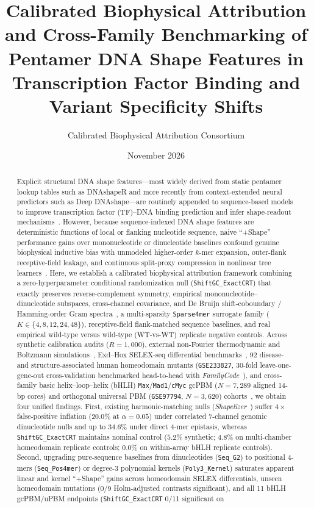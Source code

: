 \documentclass[11pt,a4paper]{article}
\title{\textbf{Calibrated Biophysical Attribution and Cross-Family Benchmarking of Pentamer DNA Shape Features in Transcription Factor Binding and Variant Specificity Shifts}}
\author{Calibrated Biophysical Attribution Consortium}
\date{November 2026}
\begin{document}
\maketitle

\begin{abstract}
Explicit structural DNA shape features---most widely derived from static pentamer lookup tables such as DNAshapeR and more recently from context-extended neural predictors such as Deep DNAshape---are routinely appended to sequence-based models to improve transcription factor (TF)--DNA binding prediction and infer shape-readout mechanisms~\cite{zhou2013nar,chiu2016bioinf,zhou2015pnas,yang2017msb,li2024natcomm,li2024nar}. However, because sequence-indexed DNA shape features are deterministic functions of local or flanking nucleotide sequence, naive ``+Shape'' performance gains over mononucleotide or dinucleotide baselines confound genuine biophysical inductive bias with unmodeled higher-order $k$-mer expansion, outer-flank receptive-field leakage, and continuous split-proxy compression in nonlinear tree learners~\cite{rube2018msb,strobl2007bmc}. Here, we establish a calibrated biophysical attribution framework combining a zero-hyperparameter conditional randomization null (\texttt{ShiftGC\_ExactCRT}) that exactly preserves reverse-complement symmetry, empirical mononucleotide--dinucleotide subspaces, cross-channel covariance, and De Bruijn shift-coboundary / Hamming-order Gram spectra~\cite{candes2018jrssb,berrett2020jrssb}, a multi-sparsity \texttt{Sparse4mer} surrogate family ($K \in \{4, 8, 12, 24, 48\}$), receptive-field flank-matched sequence baselines, and real empirical wild-type versus wild-type (WT-vs-WT) replicate negative controls. Across synthetic calibration audits ($R = 1{,}000$), external non-Fourier thermodynamic and Boltzmann simulations~\cite{santalucia1998pnas}, Exd--Hox SELEX-seq differential benchmarks~\cite{slattery2011cell,abe2015cell}, 92 disease- and structure-associated human homeodomain mutants (\texttt{GSE233827}, 30-fold leave-one-gene-out cross-validation benchmarked head-to-head with \emph{FamilyCode}~\cite{kock2024natcomm,liu2025nar}), and cross-family basic helix--loop--helix (bHLH) \texttt{Max}/\texttt{Mad1}/\texttt{cMyc} gcPBM ($N = 7{,}289$ aligned 14-bp cores) and orthogonal universal PBM (\texttt{GSE97794}, $N = 3{,}620$) cohorts~\cite{gordan2013cellrep,shen2018cels}, we obtain four unified findings. First, existing harmonic-matching nulls (\emph{Shapelizer}~\cite{rube2018msb}) suffer $4\times$ false-positive inflation ($20.0\%$ at $\alpha = 0.05$) under correlated 7-channel genomic dinucleotide nulls and up to $34.6\%$ under direct 4-mer epistasis, whereas \texttt{ShiftGC\_ExactCRT} maintains nominal control ($5.2\%$ synthetic; $4.8\%$ on multi-chamber homeodomain replicate controls; $0.0\%$ on within-array bHLH replicate controls). Second, upgrading pure-sequence baselines from dinucleotides (\texttt{Seq\_G2}) to positional 4-mers (\texttt{Seq\_Pos4mer}) or degree-3 polynomial kernels (\texttt{Poly3\_Kernel}) saturates apparent linear and kernel ``+Shape'' gains across homeodomain SELEX differentials, unseen homeodomain mutations (0/9 Holm-adjusted contrasts significant), and all 11 bHLH gcPBM/uPBM endpoints (\texttt{ShiftGC\_ExactCRT} 0/11 significant on 
\end{abstract}
\end{document}
